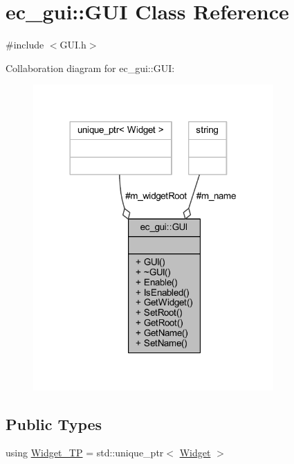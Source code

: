 \hypertarget{classec__gui_1_1_g_u_i}{}\section{ec\+\_\+gui\+:\+:G\+UI Class Reference}
\label{classec__gui_1_1_g_u_i}


{\ttfamily \#include $<$G\+U\+I.\+h$>$}



Collaboration diagram for ec\+\_\+gui\+:\+:G\+UI\+:\nopagebreak
\begin{figure}[H]
\begin{center}
\leavevmode
\includegraphics[width=260pt]{classec__gui_1_1_g_u_i__coll__graph}
\end{center}
\end{figure}
\subsection*{Public Types}
\begin{DoxyCompactItemize}
\item 
using \mbox{\hyperlink{classec__gui_1_1_g_u_i_a2b94294ea5a4ad9f8edcb4eb4d97151a}{Widget\+\_\+\+TP}} = std\+::unique\+\_\+ptr$<$ \mbox{\hyperlink{classec__gui_1_1_widget}{Widget}} $>$
\end{DoxyCompactItemize}

